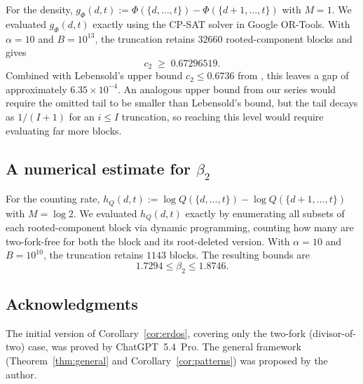 \documentclass[11pt]{amsart}
\begin{document}
For the density, \(g_\Phi(d,t):=\Phi(\{d,\dots,t\})-\Phi(\{d+1,\dots,t\})\) with \(M=1\). We evaluated \(g_\Phi(d,t)\) exactly using the CP-SAT solver in Google OR-Tools. With \(\alpha=10\) and \(B=10^{13}\), the truncation retains \(32660\) rooted-component blocks and gives
\[
c_2\;\ge\; 0.67296519.
\]
Combined with Lebensold's upper bound \(c_2\le 0.6736\) from \cite{Le76}, this leaves a gap of approximately \(6.35\times 10^{-4}\). An analogous upper bound from our series would require the omitted tail to be smaller than Lebensold's bound, but the tail decays as \(1/(I+1)\) for an \(i\le I\) truncation, so reaching this level would require evaluating far more blocks.

\subsection{A numerical estimate for \(\beta_2\)}\label{sec:beta2-numerical}

For the counting rate, \(h_Q(d,t):=\log Q(\{d,\dots,t\})-\log Q(\{d+1,\dots,t\})\) with \(M=\log 2\). We evaluated \(h_Q(d,t)\) exactly by enumerating all subsets of each rooted-component block via dynamic programming, counting how many are two-fork-free for both the block and its root-deleted version. With \(\alpha=10\) and \(B=10^{10}\), the truncation retains \(1143\) blocks. The resulting bounds are
\[
1.7294\le\beta_2\le 1.8746.
\]

\subsection*{Acknowledgments}
The initial version of Corollary~\ref{cor:erdos}, covering only the two-fork (divisor-of-two) case, was proved by ChatGPT~5.4~Pro. The general framework (Theorem~\ref{thm:general} and Corollary~\ref{cor:patterns}) was proposed by the author.



\end{document}
